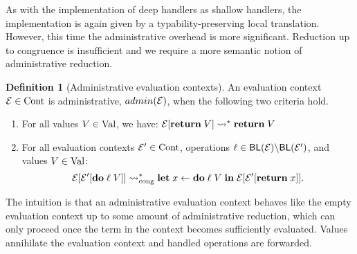 \documentclass[12pt,phd,lfcs,twoside,openright,logo,leftchapter,normalheadings]{infthesis}
\theoremstyle{plain}
\theoremstyle{definition}
\newtheorem{definition}[theorem]{Definition}
\begin{document}
As with the implementation of deep handlers as shallow handlers, the
implementation is again given by a typability-preserving local
translation. However, this time the administrative overhead is more
significant. Reduction up to congruence is insufficient and we require
a more semantic notion of administrative reduction.

\begin{definition}[Administrative evaluation contexts]\label{def:admin-eval}
  An evaluation context $\mathcal{E} \in \textrm{Cont}$ is administrative,
  $admin(\mathcal{E})$, when the following two criteria hold.
\begin{enumerate}
\item For all values $V \in \textrm{Val}$, we have: $\mathcal{E}[\mathbf{return}\;V] \leadsto^\ast
  \mathbf{return}\;V$
\item For all evaluation contexts $\mathcal{E}' \in \textrm{Cont}$, operations
  $\ell \in \mathsf{BL}(\mathcal{E}) \backslash \mathsf{BL}(\mathcal{E}')$, and values
  $V \in \textrm{Val}$:
%
\[
  \mathcal{E}[\mathcal{E}'[\mathbf{do}\;\ell\;V]] \leadsto_{\mathrm{cong}}^\ast \mathbf{let}\; x \leftarrow \mathbf{do}\;\ell\;V \;\mathbf{in}\; \mathcal{E}[\mathcal{E}'[\mathbf{return}\;x]].
\]
\end{enumerate}
\end{definition}
%
The intuition is that an administrative evaluation context behaves
like the empty evaluation context up to some amount of administrative
reduction, which can only proceed once the term in the context becomes
sufficiently evaluated.
%
Values annihilate the evaluation context and handled operations are
forwarded.
%
\end{document}
